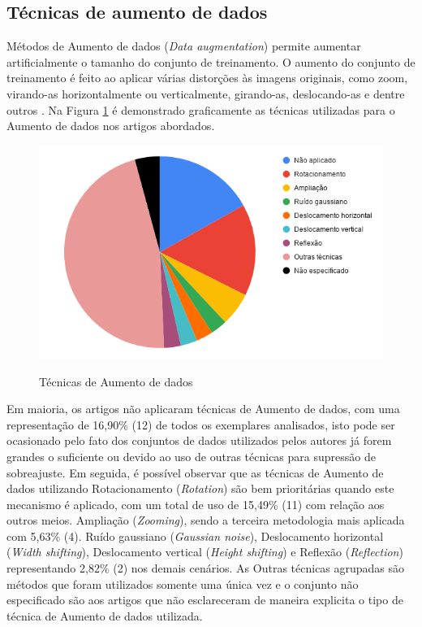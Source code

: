 \documentclass[
	12pt,				%
	oneside,			%
	a4paper,			%
	english,			%
	brazil				%
	]{abntex2ppgsi}
\begin{document}
\subsection{Técnicas de aumento de dados}
Métodos de Aumento de dados (\textit{Data augmentation}) permite aumentar artificialmente o tamanho do conjunto de treinamento. O aumento do conjunto de treinamento é feito ao aplicar várias distorções às imagens originais, como zoom, virando-as horizontalmente ou verticalmente, girando-as, deslocando-as e dentre outros \cite{gomez2019coral}. Na Figura \ref{fig:grafico_aumento-dados_vs_uso} é demonstrado graficamente as técnicas utilizadas para o Aumento de dados nos artigos abordados.

\begin{figure}[H]
    \centering
    \caption{Técnicas de Aumento de dados}
    \includegraphics[scale=.60]{imagens/revisao_sistematica/grafico_aumento-dados_vs_uso.png}
    \label{fig:grafico_aumento-dados_vs_uso}
\end{figure}

Em maioria, os artigos não aplicaram técnicas de Aumento de dados, com uma representação de 16,90\% (12) de todos os exemplares analisados, isto pode ser ocasionado pelo fato dos conjuntos de dados utilizados pelos autores já forem grandes o suficiente ou devido ao uso de outras técnicas para supressão de sobreajuste. Em seguida, é possível observar que as técnicas de Aumento de dados utilizando Rotacionamento (\textit{Rotation}) são bem prioritárias quando este mecanismo é aplicado, com um total de uso de 15,49\% (11) com relação aos outros meios. Ampliação (\textit{Zooming}), sendo a terceira metodologia mais aplicada com 5,63\% (4). Ruído gaussiano (\textit{Gaussian noise}), Deslocamento horizontal (\textit{Width shifting}), Deslocamento vertical (\textit{Height shifting}) e Reflexão (\textit{Reflection}) representando 2,82\% (2) nos demais cenários. As Outras técnicas agrupadas são métodos que foram utilizados somente uma única vez e o conjunto não especificado são aos artigos que não esclareceram de maneira explicita o tipo de técnica de Aumento de dados utilizada.
\end{document}
